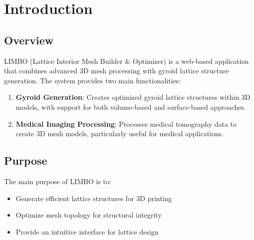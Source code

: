 \chapter{Introduction}

\section{Overview}
LIMBO (Lattice Interior Mesh Builder \& Optimizer) is a web-based application that combines advanced 3D mesh processing with gyroid lattice structure generation. The system provides two main functionalities:

\begin{enumerate}
    \item \textbf{Gyroid Generation}: Creates optimized gyroid lattice structures within 3D models, with support for both volume-based and surface-based approaches.
    \item \textbf{Medical Imaging Processing}: Processes medical tomography data to create 3D mesh models, particularly useful for medical applications.
\end{enumerate}

\section{Purpose}
The main purpose of LIMBO is to:
\begin{itemize}
    \item Generate efficient lattice structures for 3D printing
    \item Optimize mesh topology for structural integrity
    \item Provide an intuitive interface for lattice design
\end{itemize}

